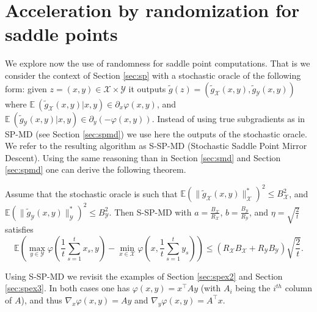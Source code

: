 \documentclass[openany]{now}
\newcommand{\tg}{\tilde{g}}
\renewcommand{\phi}{\varphi}
\newcommand{\E}{\mathbb{E}}
\newcommand{\cX}{\mathcal{X}}
\newcommand{\cY}{\mathcal{Y}}
\renewcommand{\tilde}{\widetilde}
\begin{document}
\section{Acceleration by randomization for saddle points}
We explore now the use of randomness for saddle point computations. That is we consider the context of Section \ref{sec:sp} with a stochastic oracle of the following form: given $z=(x,y) \in \cX \times \cY$ it outputs $\tg(z) = (\tg_{\cX}(x,y), \tg_{\cY}(x,y))$ where $\E \ (\tg_{\cX}(x,y) | x,y) \in \partial_x \phi(x,y)$, and $\E \ (\tg_{\cY}(x,y) | x,y) \in \partial_y (-\phi(x,y))$. Instead of using true subgradients as in SP-MD (see Section \ref{sec:spmd}) we use here the outputs of the stochastic oracle. We refer to the resulting algorithm as S-SP-MD (Stochastic Saddle Point Mirror Descent). Using the same reasoning than in Section \ref{sec:smd} and Section \ref{sec:spmd} one can derive the following theorem.
\begin{theorem} \label{th:sspmd}
Assume that the stochastic oracle is such that $\E \left(\|\tg_{\cX}(x,y)\|_{\cX}^* \right)^2 \leq B_{\cX}^2$, and $\E \left(\|\tg_{\cY}(x,y)\|_{\cY}^* \right)^2 \leq B_{\cY}^2$. Then S-SP-MD with $a= \frac{B_{\cX}}{R_{\cX}}$, $b=\frac{B_{\cY}}{R_{\cY}}$, and $\eta=\sqrt{\frac{2}{t}}$ satisfies
$$\E \left( \max_{y \in \mathcal{Y}} \phi\left( \frac1{t} \sum_{s=1}^t x_s,y \right) - \min_{x \in \mathcal{X}} \phi\left(x, \frac1{t} \sum_{s=1}^t y_s \right) \right) \leq (R_{\cX} B_{\cX} + R_{\cY} B_{\cY}) \sqrt{\frac{2}{t}}.$$
\end{theorem}
Using S-SP-MD we revisit the examples of Section \ref{sec:spex2} and Section \ref{sec:spex3}. In both cases one has $\phi(x,y) = x^{\top} A y$ (with $A_i$ being the $i^{th}$ column of $A$), and thus $\nabla_x \phi(x,y) = Ay$ and $\nabla_y \phi(x,y) = A^{\top} x$.
\newline
\end{document}
